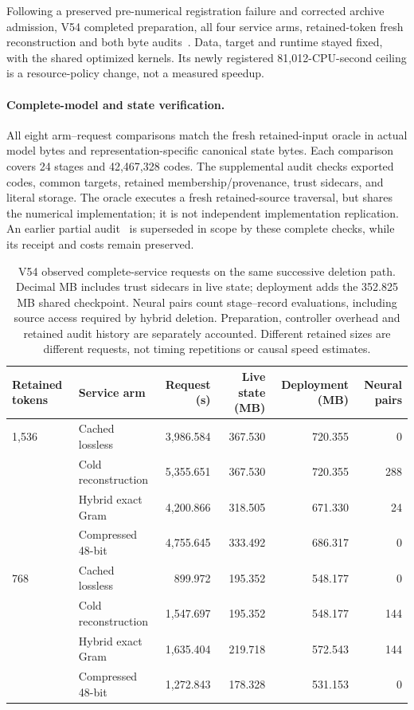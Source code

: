 \documentclass[10pt,twocolumn,letterpaper]{article}
\begin{document}
Following a preserved pre-numerical registration failure and corrected archive
admission, V54 completed preparation, all four service arms, retained-token fresh
reconstruction and both byte audits~\cite{v54,v58terminal}. Data, target and
runtime stayed fixed, with the shared optimized kernels. Its newly registered
81,012-CPU-second ceiling is a resource-policy change, not a measured speedup.

\paragraph{Complete-model and state verification.}
All eight arm--request comparisons match the fresh retained-input oracle in
actual model bytes and representation-specific canonical state bytes. Each
comparison covers 24 stages and 42,467,328 codes. The supplemental audit checks
exported codes, common targets, retained membership/provenance, trust sidecars,
and literal storage. The oracle executes a fresh retained-source traversal,
but shares the numerical implementation; it is not independent implementation
replication. An earlier partial audit~\cite{v57prefix} is superseded in scope
by these complete checks, while its receipt and costs remain preserved.

\begin{table}[t]
\centering
\small
\begin{tabular}{llrrrr}
\toprule
Retained tokens & Service arm & Request (s) & Live state (MB) & Deployment (MB) & Neural pairs \\
\midrule
1,536 & Cached lossless & 3,986.584 & 367.530 & 720.355 & 0 \\
      & Cold reconstruction & 5,355.651 & 367.530 & 720.355 & 288 \\
      & Hybrid exact Gram & 4,200.866 & 318.505 & 671.330 & 24 \\
      & Compressed 48-bit & 4,755.645 & 333.492 & 686.317 & 0 \\
\midrule
768 & Cached lossless & 899.972 & 195.352 & 548.177 & 0 \\
    & Cold reconstruction & 1,547.697 & 195.352 & 548.177 & 144 \\
    & Hybrid exact Gram & 1,635.404 & 219.718 & 572.543 & 144 \\
    & Compressed 48-bit & 1,272.843 & 178.328 & 531.153 & 0 \\
\bottomrule
\end{tabular}
\caption{V54 observed complete-service requests on the same successive deletion
path. Decimal MB includes trust sidecars in live state; deployment adds the
352.825 MB shared checkpoint. Neural pairs count stage--record evaluations,
including source access required by hybrid deletion. Preparation, controller
overhead and retained audit history are separately accounted. Different retained
sizes are different requests, not timing repetitions or causal speed estimates.}
\label{tab:v54}
\end{table}
\end{document}
